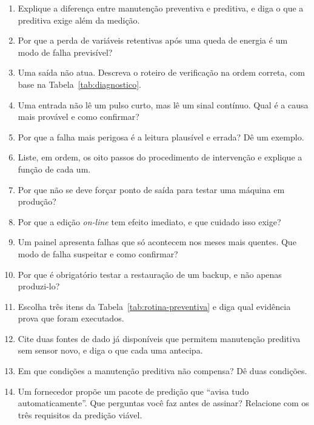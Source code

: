 \begin{exercicios}
\begin{enumerate}[label=\alph*)]
  \item Explique a diferença entre manutenção preventiva e preditiva, e diga o que a preditiva exige
        além da medição.
  \item Por que a perda de variáveis retentivas após uma queda de energia é um modo de falha
        previsível?
  \item Uma saída não atua. Descreva o roteiro de verificação na ordem correta, com base na
        Tabela~\ref{tab:diagnostico}.
  \item Uma entrada não lê um pulso curto, mas lê um sinal contínuo. Qual é a causa mais provável e
        como confirmar?
  \item Por que a falha mais perigosa é a leitura plausível e errada? Dê um exemplo.
  \item Liste, em ordem, os oito passos do procedimento de intervenção e explique a função de cada um.
  \item Por que não se deve forçar ponto de saída para testar uma máquina em produção?
  \item Por que a edição \emph{on-line} tem efeito imediato, e que cuidado isso exige?
  \item Um painel apresenta falhas que só acontecem nos meses mais quentes. Que modo de falha
        suspeitar e como confirmar?
  \item Por que é obrigatório testar a restauração de um backup, e não apenas produzi-lo?
  \item Escolha três itens da Tabela~\ref{tab:rotina-preventiva} e diga qual evidência prova que
        foram executados.
  \item Cite duas fontes de dado já disponíveis que permitem manutenção preditiva sem sensor novo, e
        diga o que cada uma antecipa.
  \item Em que condições a manutenção preditiva não compensa? Dê duas condições.
  \item Um fornecedor propõe um pacote de predição que ``avisa tudo automaticamente''. Que perguntas
        você faz antes de assinar? Relacione com os três requisitos da predição viável.
\end{enumerate}
\end{exercicios}

